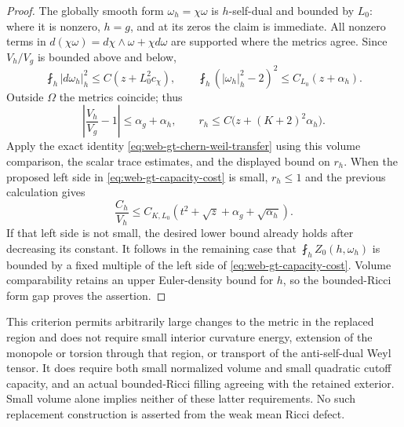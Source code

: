 \begin{proof}
The globally smooth form \(\omega_h=\chi\omega\) is \(h\)-self-dual
and bounded by \(L_0\): where it is nonzero, \(h=g\), and at its
zeros the claim is immediate.  All nonzero terms in
\(d(\chi\omega)=d\chi\wedge\omega+\chi d\omega\) are supported where
the metrics agree.  Since \(V_h/V_g\) is bounded above and below,
\[
 \fint_h|d\omega_h|_h^2\le C(z+L_0^2c_\chi),\qquad
 \fint_h(|\omega_h|_h^2-2)^2\le C_{L_0}(z+\alpha_h).
\]
Outside \(\Omega\) the metrics coincide; thus
\[
 \left|\frac{V_h}{V_g}-1\right|\le\alpha_g+\alpha_h,\qquad
 r_h\le C\bigl(z+(K+2)^2\alpha_h\bigr).
\]
Apply the exact identity \eqref{eq:web-gt-chern-weil-transfer} using
this volume comparison, the scalar trace estimates, and the displayed
bound on \(r_h\).  When the proposed left side in
\eqref{eq:web-gt-capacity-cost} is small, \(r_h\le1\) and the previous
calculation gives
\[
 \frac{C_h}{V_h}
       \le C_{K,L_0}(t^2+\sqrt z+\alpha_g+\sqrt{\alpha_h}).
\]
If that left side is not small, the desired lower bound already holds
after decreasing its constant.  It follows in the remaining case that
\(\fint_hZ_0(h,\omega_h)\) is bounded by a fixed multiple of the
left side of \eqref{eq:web-gt-capacity-cost}.  Volume comparability
retains an upper Euler-density bound for \(h\), so the bounded-Ricci
form gap proves the assertion.
\end{proof}

This criterion permits arbitrarily large changes to the metric in the
replaced region and does not require small interior curvature energy,
extension of the monopole or torsion through that region, or transport of
the anti-self-dual Weyl tensor.  It does require both small normalized
volume and small quadratic cutoff capacity, and an actual bounded-Ricci
filling agreeing with the retained exterior.  Small volume alone implies
neither of these latter requirements.  No such replacement construction
is asserted from the weak mean Ricci defect.
